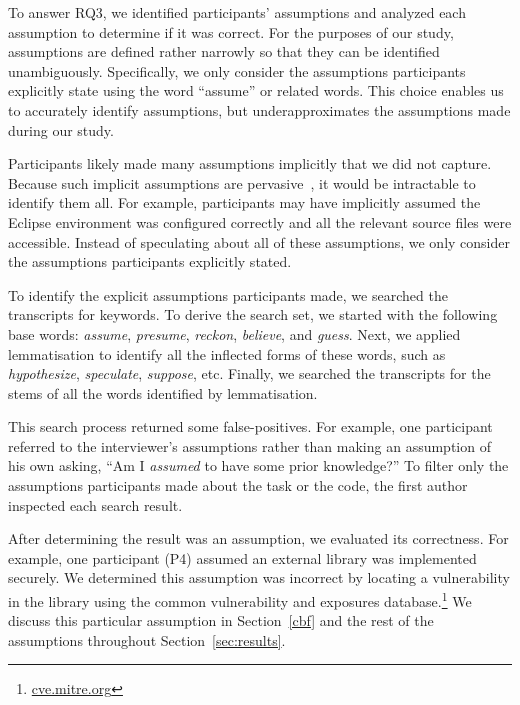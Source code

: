 \documentclass[10pt,journal,compsoc]{IEEEtran}
\begin{document}
To answer RQ3, we identified participants' assumptions and analyzed each assumption to determine if it was correct.
For the purposes of our study, assumptions are defined rather narrowly so that they can be identified unambiguously.
Specifically, we only consider the assumptions participants explicitly state using the word ``assume'' or related words.
This choice enables us to accurately identify assumptions, but underapproximates the assumptions made during our study.

Participants likely made many assumptions implicitly that we did not capture. 
Because such implicit assumptions are pervasive~\cite{fairclough2003analysing}, it would be intractable to identify them all. 
For example, participants may have implicitly assumed the Eclipse environment was configured correctly and all the relevant source files were accessible.
Instead of speculating about all of these assumptions, we only consider the assumptions participants explicitly stated.

%

To identify the explicit assumptions participants made, we searched the transcripts for keywords.
To derive the search set, we started with the following base words: \textit{assume}, \textit{presume}, \textit{reckon}, \textit{believe}, and \textit{guess}.
Next, we applied lemmatisation to identify all the inflected forms of these words, such as \textit{hypothesize}, \textit{speculate}, \textit{suppose}, etc. 
Finally, we searched the transcripts for the stems of all the words identified by lemmatisation.

This search process returned some false-positives. 
For example, one participant referred to the interviewer's assumptions rather than making an assumption of his own asking, ``Am I \textit{assumed} to have some prior knowledge?''
To filter only the assumptions participants made about the task or the code, the first author inspected each search result.

After determining the result was an assumption, we evaluated its correctness.
For example, one participant (P4) assumed an external library was implemented securely. 
We determined this assumption was incorrect by locating a vulnerability in the library using the common vulnerability and exposures database.\footnote{\url{cve.mitre.org}} We discuss this particular assumption in Section~\ref{cbf} and the rest of the assumptions throughout Section~\ref{sec:results}.
\end{document}
